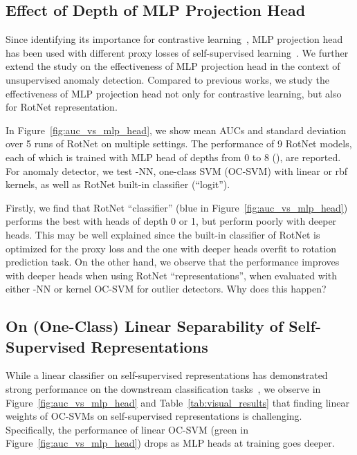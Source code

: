 \documentclass{article} \usepackage{iclr2021_conference,times}
\newcommand{\geotrans}{RotNet}
\begin{document}
\subsection{Effect of Depth of MLP Projection Head}
\label{sec:ablation_mlp}

Since identifying its importance for contrastive learning~\citep{chen2020simple}, MLP projection head has been used with different proxy losses of self-supervised learning~\citep{chen2020improved,grill2020bootstrap}. We further extend the study on the effectiveness of MLP projection head in the context of unsupervised anomaly detection. Compared to previous works, we study the effectiveness of MLP projection head not only for contrastive learning, but also for {\geotrans} representation.

In Figure~\ref{fig:auc_vs_mlp_head}, we show mean AUCs and standard deviation over 5 runs of {\geotrans} on multiple settings. The performance of 9 {\geotrans} models, each of which is trained with MLP head of depths from 0 to 8 (), are reported. For anomaly detector, we test -NN, one-class SVM (OC-SVM) with linear or rbf kernels, as well as {\geotrans} built-in classifier (``logit''). 

Firstly, we find that {\geotrans} ``classifier'' (blue in Figure~\ref{fig:auc_vs_mlp_head}) performs the best with heads of depth 0 or 1, but perform poorly with deeper heads. This may be well explained since the built-in classifier of {\geotrans} is optimized for the proxy loss and the one with deeper heads overfit to rotation prediction task. On the other hand, we observe that the performance improves with deeper heads when using {\geotrans} ``representations'', when evaluated with either -NN or kernel OC-SVM for outlier detectors. {\color{red}Why does this happen?}


\subsection{On (One-Class) Linear Separability of Self-Supervised Representations}
\label{sec:ablation_linearity}

While a linear classifier on self-supervised representations has demonstrated strong performance on the downstream classification tasks~\citep{he2020momentum,chen2020simple}, we observe in Figure~\ref{fig:auc_vs_mlp_head} and Table~\ref{tab:visual_results} that finding linear weights of OC-SVMs on self-supervised representations is challenging. Specifically, the performance of linear OC-SVM (green in Figure~\ref{fig:auc_vs_mlp_head}) drops as MLP heads at training goes deeper.
\end{document}
